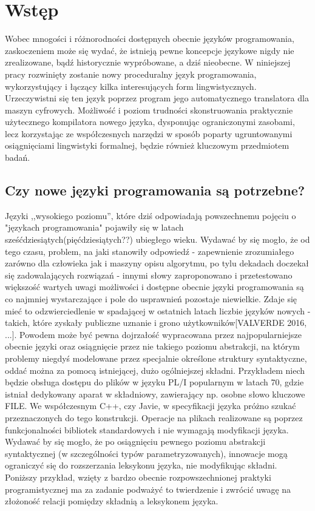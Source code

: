 \chapter{Wstęp}
\label{cha:wstep}

Wobec mnogości i różnorodności dostępnych obecnie języków programowania, zaskoczeniem może się wydać, że istnieją pewne koncepcje językowe nigdy nie zrealizowane, bądź historycznie wypróbowane, a dziś nieobecne. W niniejszej pracy rozwinięty zostanie nowy proceduralny język programowania, wykorzystujący i łączący kilka interesujących form lingwistycznych.
Urzeczywistni się ten język poprzez program jego automatycznego translatora dla maszyn cyfrowych. Możliwość i poziom trudności skonstruowania praktycznie użytecznego kompilatora nowego języka, dysponując ograniczonymi zasobami, lecz korzystając ze współczesnych narzędzi w sposób poparty ugruntowanymi osiągnięciami lingwistyki formalnej, będzie również kluczowym przedmiotem badań.


\section{Czy nowe języki programowania są potrzebne?}
Języki ,,wysokiego poziomu'', które dziś odpowiadają powszechnemu pojęciu o "językach programowania" pojawiły się w latach sześćdziesiątych(pięćdziesiątych??) ubiegłego wieku. Wydawać by się mogło, że od tego czasu, problem, na jaki stanowiły odpowiedź - zapewnienie zrozumiałego zarówno dla człowieka jak i maszyny opisu algorytmu, po tylu dekadach doczekał się zadowalających rozwiązań - innymi słowy zaproponowano i przetestowano większość wartych uwagi możliwości i dostępne obecnie języki programowania są co najmniej wystarczające i pole do usprawnień pozostaje niewielkie.
Zdaje się mieć to odzwierciedlenie w spadającej w ostatnich latach liczbie języków nowych - takich, które zyskały publiczne uznanie i grono użytkowników[VALVERDE 2016, ...]. Powodem może być pewna dojrzałość wypracowana przez najpopularniejsze obecnie języki oraz osiągnięcie przez nie takiego poziomu abstrakcji, na którym problemy niegdyś modelowane przez specjalnie określone struktury syntaktyczne, oddać można za pomocą istniejącej, dużo ogólniejszej składni.
Przykładem niech będzie obsługa dostępu do plików w języku PL/I popularnym w latach 70, gdzie istniał dedykowany aparat w składniowy, zawierający np. osobne słowo kluczowe FILE. We współczesnym C++, czy Javie, w specyfikacji języka próżno szukać przeznaczonych do tego konstrukcji. Operacje na plikach realizowane są poprzez funkcjonalności bibliotek standardowych i nie wymagają modyfikacji języka.
Wydawać by się mogło, że po osiągnięciu pewnego poziomu abstrakcji syntaktycznej (w szczególności typów parametryzowanych), innowacje mogą ograniczyć się do rozszerzania leksykonu języka, nie modyfikując składni. Poniższy przykład, wzięty z bardzo obecnie rozpowszechnionej praktyki programistycznej ma za zadanie podważyć to twierdzenie i zwrócić uwagę na złożoność relacji pomiędzy składnią a leksykonem języka.

